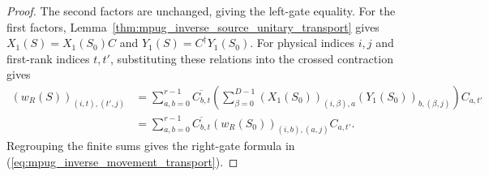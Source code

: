 \begin{proof}\leanok
    The second factors are unchanged, giving the left-gate equality.
    For the first factors, Lemma~\ref{thm:mpug_inverse_source_unitary_transport}
    gives $X_1(S)=X_1(S_0)C$ and $Y_1(S)=C^\dagger Y_1(S_0)$.
    For physical indices $i,j$ and first-rank indices $t,t'$, substituting
    these relations into the crossed contraction gives
    \begin{align}
        (w_R(S))_{(i,t),(t',j)}
         & =\sum_{a,b=0}^{r-1}\overline{C_{b,t}}
        \left(\sum_{\beta=0}^{D-1}
        (X_1(S_0))_{(i,\beta),a}(Y_1(S_0))_{b,(\beta,j)}\right)C_{a,t'} \\
         & =\sum_{a,b=0}^{r-1}\overline{C_{b,t}}
        (w_R(S_0))_{(i,b),(a,j)}C_{a,t'}.
    \end{align}
    Regrouping the finite sums gives the right-gate formula in
    (\ref{eq:mpug_inverse_movement_transport}).
\end{proof}

